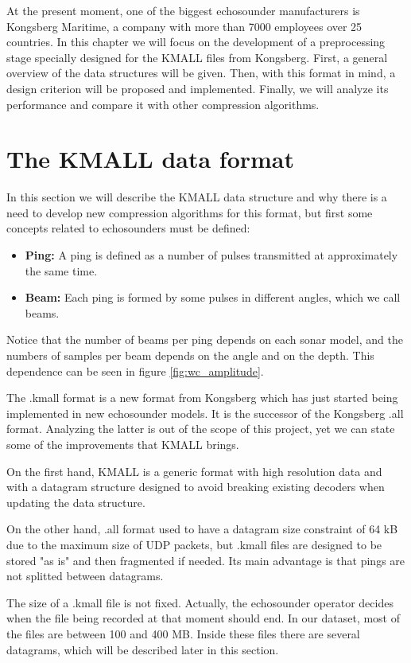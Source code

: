 At the present moment, one of the biggest echosounder manufacturers is Kongsberg Maritime, a company with more than 7000 employees over 25 countries. In this chapter we will focus on the development of a preprocessing stage specially designed for the KMALL files from Kongsberg. First, a general overview of the data structures will be given. Then, with this format in mind, a design criterion will be proposed and implemented. Finally, we will analyze its performance and compare it with other compression algorithms.

\section{The KMALL data format} \label{sec:kmall_format}
In this section we will describe the KMALL data structure and why there is a need to develop new compression algorithms for this format, but first some concepts related to echosounders must be defined:
\begin{itemize}
	\item \textbf{Ping:} A ping is defined as a number of pulses transmitted at approximately the same time.
	\item \textbf{Beam:} Each ping is formed by some pulses in different angles, which we call beams.
\end{itemize}

Notice that the number of beams per ping depends on each sonar model, and the numbers of samples per beam depends on the angle and on the depth. This dependence can be seen in figure \ref{fig:wc_amplitude}.

The .kmall format is a new format from Kongsberg which has just started being implemented in new echosounder models. It is the successor of the Kongsberg .all format. Analyzing the latter is out of the scope of this project, yet we can state some of the improvements that KMALL brings.

On the first hand, KMALL is a generic format with high resolution data and with a datagram structure designed to avoid breaking existing decoders when updating the data structure.

On the other hand, .all format used to have a datagram size constraint of 64 kB due to the maximum size of UDP packets, but .kmall files are designed to be stored "as is" and then fragmented if needed. Its main advantage is that pings are not splitted between datagrams.

The size of a .kmall file is not fixed. Actually, the echosounder operator decides when the file being recorded at that moment should end. In our dataset, most of the files are between 100 and 400 MB. Inside these files there are several datagrams, which will be described later in this section.

